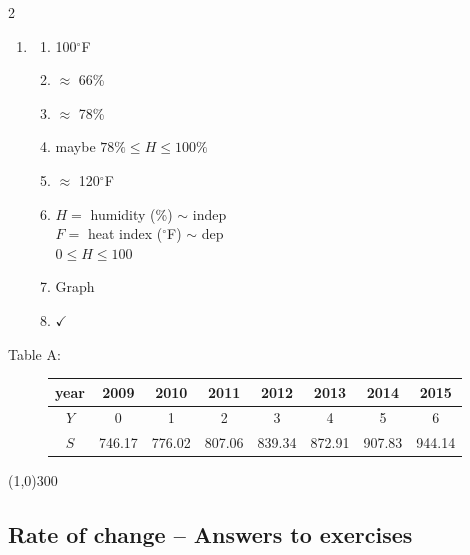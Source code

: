 \begin{multicols} {2}
\begin{enumerate}
\item %
\begin{enumerate}
\item 100$^\circ$F
\item $\approx$ 66\%
\item $\approx$ 78\%
\item maybe $78\% \le H \le 100\%$
\item $\approx$ 120$^\circ$F
\item $H=$ humidity (\%) $\sim$ indep \\ $F=$ heat index ($^\circ$F) $\sim$ dep \\
 $0 \le H \le 100$
 \item Graph
 \item $\checkmark$
\end{enumerate}

\end{enumerate}
\end{multicols}

\bigskip
\begin{description}
\item[\quad Table A: \quad] \begin{tabular} {|c| |c|c |c|c |c|c |c|}\hline
year & 2009 & 2010 & 2011 & 2012 & 2013& 2014 & 2015 \\ \hline
$Y$ & 0 & 1 & 2& 3 & 4 & 5 & 6 \\ \hline
$S$ & 746.17 & 776.02 & 807.06 & 839.34 & 872.91 & 907.83 & 944.14 \\ \hline
\end{tabular}
\end{description}
\bigskip

\begin{center}
\line(1,0){300} %
\end{center}

\subsection {Rate of change -- Answers to exercises} %

